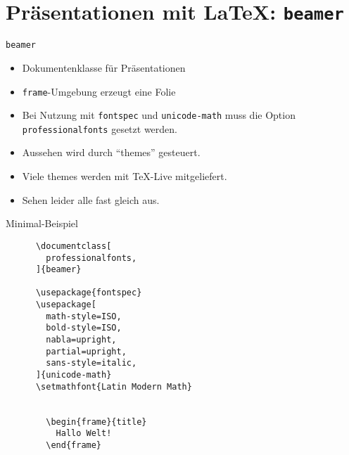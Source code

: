 \section{Präsentationen mit \LaTeX: \texttt{beamer}}

\begin{frame}[fragile]{
  \texttt{beamer}
  \hfill
}
  \begin{itemize}
    \item Dokumentenklasse für Präsentationen
    \item \lstinline+frame+-Umgebung erzeugt eine Folie
    \item Bei Nutzung mit \lstinline+fontspec+ und \lstinline+unicode-math+ muss die Option \texttt{professionalfonts} gesetzt werden.
    \item Aussehen wird durch \enquote{themes} gesteuert.
    \item Viele themes werden mit \TeX-Live mitgeliefert.
    \item Sehen leider alle fast gleich aus.
  \end{itemize}
\end{frame}
\begin{frame}[fragile]{Minimal-Beispiel}
  \begin{center}
    \begin{lstlisting}
      \documentclass[
        professionalfonts,
      ]{beamer}

      \usepackage{fontspec}
      \usepackage[
        math-style=ISO,
        bold-style=ISO,
        nabla=upright,
        partial=upright,
        sans-style=italic,
      ]{unicode-math}
      \setmathfont{Latin Modern Math}

      
        \begin{frame}{title}
          Hallo Welt!
        \end{frame}
      
    \end{lstlisting}
  \end{center}
\end{frame}
